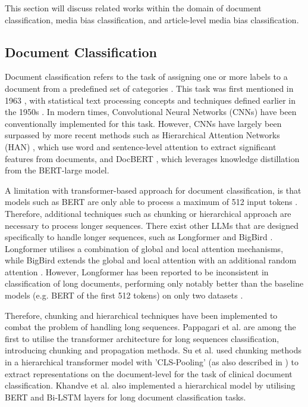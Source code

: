 This section will discuss related works within the domain of document classification, media bias classification, and article-level media bias classification.

\subsection{Document Classification}

Document classification refers to the task of assigning one or more labels to a document from a predefined set of categories \cite{wan-2019-long-length}. This task was first mentioned in 1963 \cite{borko-1963-auto-doc-classification}, with statistical text processing concepts and techniques defined earlier in the 1950s \cite{luhn-1958-business-intelligence-system}. In modern times, Convolutional Neural Networks (CNNs) \cite{afzal-deepdocclassifier,liu-2017-xmlcnn} have been conventionally implemented for this task. However, CNNs have largely been surpassed by more recent methods such as Hierarchical Attention Networks (HAN) \cite{yang-2016-han}, which use word and sentence-level attention to extract significant features from documents, and DocBERT \cite{adhikari-2019-docbert}, which leverages knowledge distillation from the BERT-large model.

A limitation with transformer-based approach for document classification, is that models such as BERT are only able to process a maximum of 512 input tokens \cite{devlin-2019-bert}. Therefore, additional techniques such as chunking or hierarchical approach are necessary to process longer sequences. There exist other LLMs that are designed specifically to handle longer sequences, such as Longformer \cite{beltagy-2020-longformer} and BigBird \cite{zaheer-2021-bigbird}. Longformer utilises a combination of global and local attention mechanisms, while BigBird extends the global and local attention with an additional random attention \cite{zaheer-2021-bigbird,beltagy-2020-longformer}. However, Longformer has been reported to be inconsistent in classification of long documents, performing only notably better than the baseline models (e.g. BERT of the first 512 tokens) on only two datasets \cite{park-2022-efficient}.

Therefore, chunking and hierarchical techniques have been implemented to combat the problem of handling long sequences. Pappagari et al. \cite{pappagari-2019-hierarchical} are among the first to utilise the transformer architecture for long sequences classification, introducing chunking and propagation methods. Su et al. \cite{su-2021-classifying} used chunking methods in a hierarchical transformer model with 'CLS-Pooling' (as also described in \cite{adhikari-2019-docbert}) to extract representations on the document-level for the task of clinical document classification. Khandve et al. \cite{khandve-2022-hierarchical-longdoc} also implemented a hierarchical model by utilising BERT and Bi-LSTM layers for long document classification tasks.

